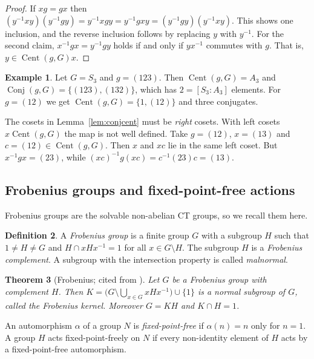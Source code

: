 \documentclass[12pt,letterpaper]{article}
\numberwithin{equation}{section}
\theoremstyle{plain}
\newtheorem{theorem}{Theorem}[section]
\theoremstyle{definition}
\newtheorem{definition}[theorem]{Definition}
\newtheorem{example}[theorem]{Example}
\DeclareMathOperator{\Cent}{Cent}
\DeclareMathOperator{\Conj}{Conj}
\begin{document}
\begin{proof}
If $xg=gx$ then $(y^{-1}xy)(y^{-1}gy)=y^{-1}xgy=y^{-1}gxy=
(y^{-1}gy)(y^{-1}xy)$. This shows one inclusion, and the reverse inclusion
follows by replacing $y$ with $y^{-1}$. For the second claim,
$x^{-1}gx=y^{-1}gy$ holds if and only if $yx^{-1}$ commutes with $g$. That
is, $y\in\Cent(g,G)x$.
\end{proof}

\begin{example}\label{ex:s3conj}
Let $G=S_3$ and $g=(123)$. Then $\Cent(g,G)=A_3$ and $\Conj(g,G)=
\{(123),(132)\}$, which has $2=[S_3:A_3]$ elements. For $g=(12)$ we get
$\Cent(g,G)=\{1,(12)\}$ and three conjugates.

The cosets in Lemma~\ref{lem:conjcent} must be \emph{right} cosets. With
left cosets $x\Cent(g,G)$ the map is not well defined. Take $g=(12)$,
$x=(13)$ and $c=(12)\in\Cent(g,G)$. Then $x$ and $xc$ lie in the
same left coset. But $x^{-1}gx=(23)$, while $(xc)^{-1}g(xc)=
c^{-1}(23)c=(13)$.
\end{example}

\subsection{Frobenius groups and fixed-point-free actions}\label{sec:frob}

Frobenius groups are the solvable non-abelian CT groups, so we recall them
here.

\begin{definition}\label{def:frob}
A \emph{Frobenius group} is a finite group $G$ with a subgroup $H$ such
that $1\neq H\neq G$ and $H\cap xHx^{-1}=1$ for all $x\in G\setminus H$.
The subgroup $H$ is a \emph{Frobenius complement}. A subgroup with the
intersection property is called \emph{malnormal}.
\end{definition}

\begin{theorem}[Frobenius; cited from {\cite[Thm.~7.2]{Is76}}]
\label{thm:frobenius}
Let $G$ be a Frobenius group with complement $H$. Then
$K=\bigl(G\setminus\bigcup_{x\in G}xHx^{-1}\bigr)\cup\{1\}$ is a normal
subgroup of $G$, called the \emph{Frobenius kernel}. Moreover $G=KH$ and
$K\cap H=1$.
\end{theorem}

An automorphism $\alpha$ of a group $N$ is \emph{fixed-point-free} if
$\alpha(n)=n$ only for $n=1$. A group $H$ acts fixed-point-freely on $N$ if
every non-identity element of $H$ acts by a fixed-point-free automorphism.
\end{document}
